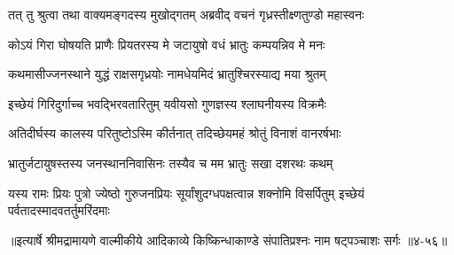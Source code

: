 \twolineshloka
{तत् तु श्रुत्वा तथा वाक्यमङ्गदस्य मुखोद्गतम्}
{अब्रवीद् वचनं गृध्रस्तीक्ष्णतुण्डो महास्वनः} %

\twolineshloka
{कोऽयं गिरा घोषयति प्राणैः प्रियतरस्य मे}
{जटायुषो वधं भ्रातुः कम्पयन्निव मे मनः} %

\twolineshloka
{कथमासीज्जनस्थाने युद्धं राक्षसगृध्रयोः}
{नामधेयमिदं भ्रातुश्चिरस्याद्य मया श्रुतम्} %

\twolineshloka
{इच्छेयं गिरिदुर्गाच्च भवद्भिरवतारितुम्}
{यवीयसो गुणज्ञस्य श्लाघनीयस्य विक्रमैः} %

\twolineshloka
{अतिदीर्घस्य कालस्य परितुष्टोऽस्मि कीर्तनात्}
{तदिच्छेयमहं श्रोतुं विनाशं वानरर्षभाः} %

\twolineshloka
{भ्रातुर्जटायुषस्तस्य जनस्थाननिवासिनः}
{तस्यैव च मम भ्रातुः सखा दशरथः कथम्} %

\threelineshloka
{यस्य रामः प्रियः पुत्रो ज्येष्ठो गुरुजनप्रियः}
{सूर्यांशुदग्धपक्षत्वान्न शक्नोमि विसर्पितुम्}
{इच्छेयं पर्वतादस्मादवतर्तुमरिंदमाः} %


॥इत्यार्षे श्रीमद्रामायणे वाल्मीकीये आदिकाव्ये किष्किन्धाकाण्डे संपातिप्रश्नः नाम षट्पञ्चाशः सर्गः ॥४-५६॥
